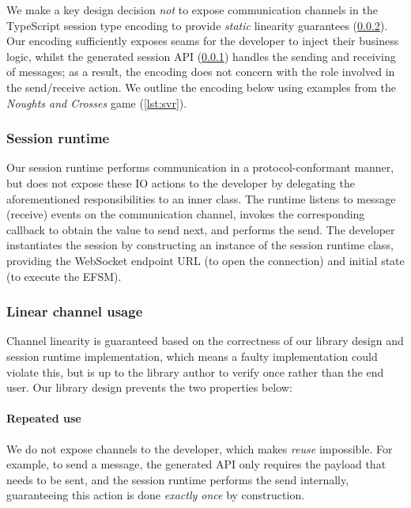 We make a key design decision \textit{not} to expose communication channels in
the TypeScript session type encoding to provide \textit{static} linearity
guarantees (\cref{section:serverlinear}).
Our encoding sufficiently exposes seams for the developer to inject their
business logic, whilst the generated session API
(\cref{section:serversessionapi}) handles the sending and receiving of
messages;
as a result, the encoding does not concern with the role involved in the
send/receive action. We outline the encoding below using examples from the
\textit{Noughts and Crosses} game (\cref{lst:svr}).

\subsubsection{Session runtime}
\label{section:serversessionapi}

Our session runtime performs communication in a protocol-conformant manner, but
does not expose these IO actions to the developer by delegating the
aforementioned responsibilities to an inner class.
The runtime listens to message (receive) events on the communication channel,
invokes the corresponding callback to obtain the value to send next, and
performs the send.
The developer instantiates the session by constructing an instance of the
session runtime class, providing the WebSocket endpoint URL (to open the
connection) and initial state (to execute the EFSM).

\subsubsection{Linear channel usage}
\label{section:serverlinear}
Channel linearity is guaranteed based on the correctness of our library design
and session runtime implementation, which means a faulty implementation could
violate this, but is up to the library author to verify once rather than the
end user. Our library design prevents the two properties below:

\paragraph{Repeated use}
We do not expose channels to the developer, which makes \textit{reuse}
impossible.
For example, to send a message, the generated API only requires the payload
that needs to be sent, and the session runtime performs the send internally,
guaranteeing this action is done \textit{exactly once} by construction.

